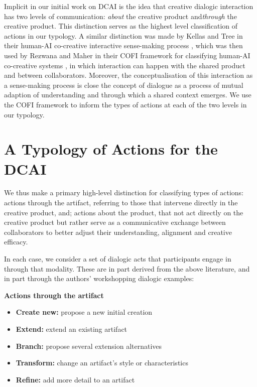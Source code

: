 \documentclass[acmlarge, nonacm, screen]{acmart} %
\begin{document}
Implicit in our initial work on DCAI \citep{bownspeculative2020} is the idea that creative dialogic interaction has two levels of communication: \emph{about} the creative product and\emph{through} the creative product. This distinction serves as the highest level classification of actions in our typology. A similar distinction was made by Kellas and Tree in their human-AI co-creative interactive sense-making process \cite{Kellas2005-lc}, which was then used by Rezwana and Maher in their COFI framework for classifying human-AI co-creative systems \cite{Rezwana_undated-dr}, in which interaction can happen with the shared product and between collaborators. Moreover, the conceptualisation of this interaction as a sense-making process is close the concept of dialogue as a process of mutual adaption of understanding and through which a shared context emerges. We use the COFI framework to inform the types of actions at each of the two levels in our typology. 
    
\section{A Typology of Actions for the DCAI}

We thus make a primary high-level distinction for classifying types of actions: actions through the artifact, referring to those that intervene directly in the creative product, and; actions about the product, that not act directly on the creative product but rather serve as a communicative exchange between collaborators to better adjust their understanding, alignment and creative efficacy. 

In each case, we consider a set of dialogic acts that participants engage in through that modality. These are in part derived from the above literature, and in part through the authors' workshopping dialogic examples:

\textbf{Actions through the artifact}


\begin{itemize}

  \item \relax \textbf{Create new:} propose a new initial creation
  \item \relax \textbf{Extend:} extend an existing artifact
   \item \relax \textbf{Branch:} propose several extension alternatives
  \item \relax \textbf{Transform:} change an artifact's style or characteristics
  \item \relax \textbf{Refine:} add more detail to an artifact 
 
\end{itemize}
\end{document}
